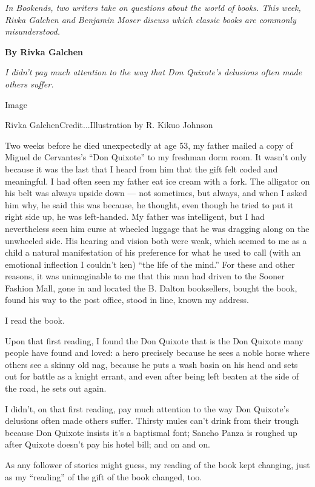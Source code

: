 \emph{In Bookends, two writers take on questions about the world of
books. This week, Rivka Galchen and Benjamin Moser discuss which classic
books are commonly misunderstood.}

\textbf{By Rivka Galchen}

\emph{I didn't pay much attention to the way that Don Quixote's
delusions often made others suffer.}

Image

Rivka GalchenCredit...Illustration by R. Kikuo Johnson

Two weeks before he died unexpectedly at age 53, my father mailed a copy
of Miguel de Cervantes's ``Don Quixote'' to my freshman dorm room. It
wasn't only because it was the last that I heard from him that the gift
felt coded and meaningful. I had often seen my father eat ice cream with
a fork. The alligator on his belt was always upside down --- not
sometimes, but always, and when I asked him why, he said this was
because, he thought, even though he tried to put it right side up, he
was left-handed. My father was intelligent, but I had nevertheless seen
him curse at wheeled luggage that he was dragging along on the unwheeled
side. His hearing and vision both were weak, which seemed to me as a
child a natural manifestation of his preference for what he used to call
(with an emotional inflection I couldn't ken) ``the life of the mind.''
For these and other reasons, it was unimaginable to me that this man had
driven to the Sooner Fashion Mall, gone in and located the B. Dalton
booksellers, bought the book, found his way to the post office, stood in
line, known my address.

I read the book.

Upon that first reading, I found the Don Quixote that is the Don Quixote
many people have found and loved: a hero precisely because he sees a
noble horse where others see a skinny old nag, because he puts a wash
basin on his head and sets out for battle as a knight errant, and even
after being left beaten at the side of the road, he sets out again.

I didn't, on that first reading, pay much attention to the way Don
Quixote's delusions often made others suffer. Thirsty mules can't drink
from their trough because Don Quixote insists it's a baptismal font;
Sancho Panza is roughed up after Quixote doesn't pay his hotel bill; and
on and on.

As any follower of stories might guess, my reading of the book kept
changing, just as my ``reading'' of the gift of the book changed, too.

